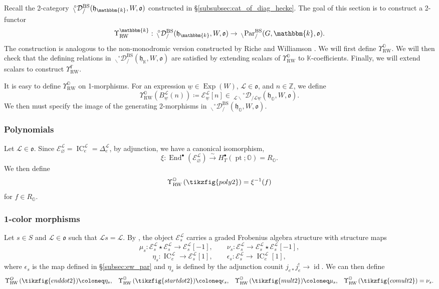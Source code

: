 \documentclass{amsart}
\newcommand{\Z}{\mathbb{Z}}
\newcommand{\F}{\mathbb{F}}
\renewcommand{\O}{\mathbb{O}}
\newcommand{\K}{\mathbb{K}}
\renewcommand{\k}{\mathbbm{k}}
\newcommand{\scrE}{\mathcal{E}}
\newcommand{\scrL}{\mathcal{L}}
\DeclareMathOperator{\End}{End}
\DeclareMathOperator{\IC}{IC}
\DeclareMathOperator{\pt}{pt}
\DeclareMathOperator{\id}{id}
\newcommand{\fr}[1]{\mathfrak{#1}}
\DeclareMathOperator{\RW}{RW}
\DeclareMathOperator{\BS}{BS}
\newcommand{\PEE}[2]{\:_{#1 \backslash} \textnormal{Par}_{/ #2} }
\newcommand{\grEWmon}[2]{\:_{#1 \backslash} \!\! {}^{\circ} \mathcal{D}_{/ #2} }
\DeclareMathOperator{\Exp}{Exp}
\newcommand{\uw}{\underline{w}}
\renewcommand{\emptyset}{\varnothing}
\theoremstyle{definition}
\numberwithin{equation}{subsection}
\begin{document}
Recall the 2-category $\grEWmon{}{}^{\BS} (\fr{h}_{\k}, W, \fr{o})$ constructed in \S\ref{subsubsec:cat_of_diag_hecke}.
The goal of this section is to construct a 2-functor
\[\Upsilon_{\textnormal{RW}}^{\k} :  \grEWmon{}{}^{\BS} (\fr{h}_{\k}, W, \fr{o}) \to \PEE{}{}^{\BS} (G, \k, \fr{o}).\]
The construction is analogous to the non-monodromic version constructed by Riche and Williamson \cite{RW}.
We will first define $\Upsilon_{\RW}^{\O}$. We will then check that the defining relations in $\grEWmon{}{}^{\BS} (\fr{h}_{\K}, W, \fr{o})$ are satisfied by extending scalars of $\Upsilon_{\RW}^{\O}$ to $\K$-coefficients.
Finally, we will extend scalars to construct $\Upsilon_{\RW}^{\F}$.

It is easy to define $\Upsilon_{\RW}^{\O}$ on 1-morphisms. For an expression $\uw \in \Exp (W)$, $\scrL \in \fr{o}$, and $n \in \Z$, we define
\[\Upsilon_{\RW}^{\O} (B_{\uw}^{\scrL} (n)) \coloneq \scrE_{\uw}^{\scrL} [n] \in \grEWmon{\scrL}{\scrL \uw} (\fr{h}_{\O}, W, \fr{o}).\]
We then must specify the image of the generating 2-morphisms in $\grEWmon{}{}^{\BS} (\fr{h}_{\O}, W, \fr{o})$.

\subsubsection{Polynomials}

Let $\scrL \in \fr{o}$.
Since $\scrE_{\emptyset}^{\scrL} = \IC_e^{\scrL} = \Delta_e^{\scrL}$, by adjunction, we have a canonical isomorphism,
\[\xi : \End^{\bullet} (\scrE_{\emptyset}^{\scrL}) \stackrel{\sim}{\to} H_T^{\bullet} (\pt; \O) = R_{\O}.\]
We then define
\[\Upsilon_{\RW}^{\O} \left( \tikzfig{poly2}\right) = \xi^{-1} (f)\]
for $f \in R_{\O}$.

\subsubsection{1-color morphisms}

Let $s \in S$ and $\scrL \in \fr{o}$ such that $\scrL s = \scrL$.
By \cite[Lemma 4.3.7]{Sandvik}, the object $\scrE_s^{\scrL}$ carries a graded Frobenius algebra structure with structure maps
\[\mu_s : \scrE_s^{\scrL} \star \scrE_s^{\scrL} \to \scrE_s^{\scrL} [-1], \qquad \nu_s : \scrE_s^{\scrL}  \to \scrE_s^{\scrL}  \star \scrE_s^{\scrL}[-1],\]
\[\eta_s : \IC_e^{\scrL} \to \scrE_s^{\scrL} [1], \qquad \epsilon_s : \scrE_s^{\scrL} \to \IC_e^{\scrL} [1],\]
where $\epsilon_s$ is the map defined in \S\ref{subsec:ew_par} and $\eta_s$ is defined by the adjunction counit $j_{e*} j_e^! \to \id$.
We can then define  
\begin{align*}
 \Upsilon_{\RW}^{O} \left(\tikzfig{enddot2} \right) &\coloneq \eta_s , & \Upsilon_{\RW}^{\O} \left(\tikzfig{startdot2} \right) &\coloneq \epsilon_s,  & \Upsilon_{\RW}^{\O} \left(\tikzfig{mult2} \right) &\coloneq  \mu_s, & \Upsilon_{\RW}^{\O} \left(\tikzfig{comult2} \right) = \nu_s.
\end{align*}
\end{document}
